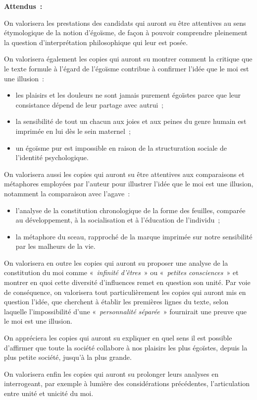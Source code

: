 {\textbf{Attendus~:}

On valorisera les prestations des candidats qui auront su être attentives au sens
étymologique de la notion d'égoïsme, de façon à pouvoir comprendre pleinement la
question d'interprétation philosophique qui leur est posée.

On valorisera également les copies qui auront su montrer comment la critique que le
texte formule à l'égard de l'égoïsme contribue à confirmer l'idée que le moi est une
illusion~:

\begin{itemize}
\item les plaisirs et les douleurs ne sont jamais purement égoïstes parce que leur
consistance dépend de leur partage avec autrui~;
\item la sensibilité de tout un chacun aux joies et aux peines du genre humain est
imprimée en lui dès le sein maternel~;
\item un égoïsme pur est impossible en raison de la structuration sociale de l'identité
psychologique.
\end{itemize}
On valorisera aussi les copies qui auront su être attentives aux comparaisons et
métaphores employées par l'auteur pour illustrer l'idée que le moi est une illusion, notamment la comparaison avec l'agave~:
\begin{itemize}
\item l'analyse de la constitution chronologique de la forme des feuilles, comparée au
développement, à la socialisation et à l'éducation de l'individu~;
\item la métaphore du sceau, rapproché de la marque imprimée sur notre sensibilité par
les malheurs de la vie.
\end{itemize}
On valorisera en outre les copies qui auront su proposer une analyse de la constitution
du moi comme «~\textit{infinité d'êtres}~» ou «~\textit{petites consciences}~» et montrer en quoi cette
diversité d'influences remet en question son unité. Par voie de conséquence, on
valorisera tout particulièrement les copies qui auront mis en question l'idée, que
cherchent à établir les premières lignes du texte, selon laquelle l'impossibilité d'une
«~\textit{personnalité séparée}~» fournirait une preuve que le moi est une illusion.

On appréciera les copies qui auront su expliquer en quel sens il est possible d'affirmer
que toute la société collabore à nos plaisirs les plus égoïstes, depuis la plus petite
société, jusqu'à la plus grande.

On valorisera enfin les copies qui auront su prolonger leurs analyses en interrogeant,
par exemple à lumière des considérations précédentes, l'articulation entre unité et
unicité du moi.}%

